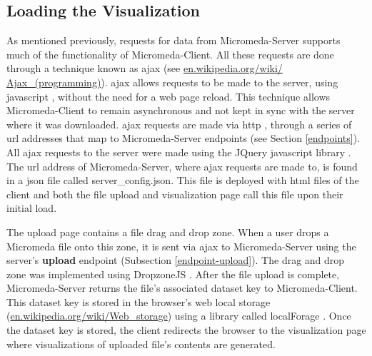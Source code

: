 \subsection{Loading the Visualization}

As mentioned previously, requests for data from Micromeda-Server supports much of the functionality of Micromeda-Client. All these requests are done through a technique known as \gls{ajax} \cite{garrett2005ajax,li2012jquery} (see \href{en.wikipedia.org/wiki/Ajax\_(programming)}{en.wikipedia.org/wiki/ Ajax\_(programming)}). \gls{ajax}  allows requests to be made to the server, using \gls{javascript} \cite{flanagan2006javascript}, without the need for a web page reload. This technique allows Micromeda-Client to remain asynchronous and not kept in sync with the server where it was downloaded. \gls{ajax}  requests are made via \gls{http} \cite{fielding1999hypertext}, through a series of \gls{url} addresses \cite{berners1994rfc} that map to Micromeda-Server endpoints (see Section \ref{endpoints}). All \gls{ajax}  requests to the server were made using the JQuery \gls{javascript} library \cite{chaffer2013learning,li2012jquery}. The \gls{url} address of Micromeda-Server, where \gls{ajax}  requests are made to, is found in a \gls{json} file called server\_config.json. This file is deployed with \gls{html} files of the client and both the file upload and visualization page call this file upon their initial load.

The upload page contains a file drag and drop zone. When a user drops a Micromeda file onto this zone, it is sent via \gls{ajax}  to Micromeda-Server using the server's \textbf{upload} endpoint (Subsection \ref{endpoint-upload}). The drag and drop zone was implemented using DropzoneJS \cite{meno}. After the file upload is complete, Micromeda-Server returns the file's associated dataset key to Micromeda-Client. This dataset key is stored in the browser's web local storage \cite{Hickson} (\href{en.wikipedia.org/wiki/Web\_storage}{en.wikipedia.org/wiki/Web\_storage}) using a library called localForage \cite{localforage}. Once the dataset key is stored, the client redirects the browser to the visualization page where visualizations of uploaded file's contents are generated.

